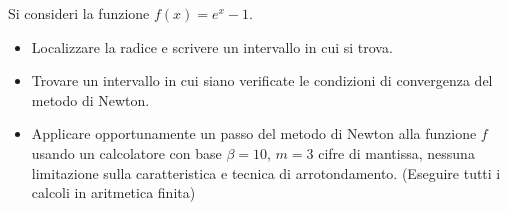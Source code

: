 Si consideri la funzione $f(x)=e^x-1$.
\begin{itemize}
\item  Localizzare la radice e
scrivere un intervallo in cui si trova.
\item Trovare un intervallo in cui siano verificate le condizioni di convergenza del metodo di Newton.
\item Applicare opportunamente un passo del metodo di Newton alla funzione $f$
usando un calcolatore con base $\beta =10$, $m=3$ cifre di
mantissa, nessuna limitazione sulla caratteristica e tecnica di
arrotondamento. (Eseguire tutti i calcoli in aritmetica finita)
\end{itemize}
